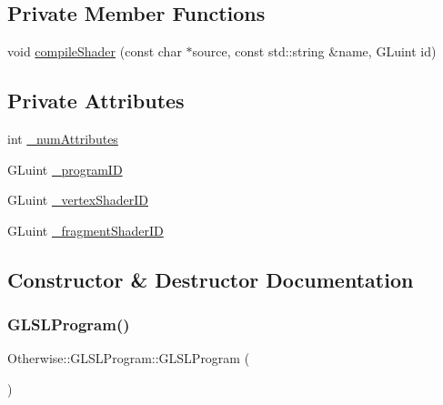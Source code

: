 \subsection*{Private Member Functions}
\begin{DoxyCompactItemize}
\item 
void \hyperlink{class_otherwise_1_1_g_l_s_l_program_aca04ece411763ec9f4ca8844bc6d604e}{compile\+Shader} (const char $\ast$source, const std\+::string \&name, G\+Luint id)
\end{DoxyCompactItemize}
\subsection*{Private Attributes}
\begin{DoxyCompactItemize}
\item 
int \hyperlink{class_otherwise_1_1_g_l_s_l_program_aeafefdfa07adcfdaabced1f366aa3d01}{\+\_\+num\+Attributes}
\item 
G\+Luint \hyperlink{class_otherwise_1_1_g_l_s_l_program_abfd84b5a206e36403770f2a207beb0fa}{\+\_\+program\+ID}
\item 
G\+Luint \hyperlink{class_otherwise_1_1_g_l_s_l_program_a13392933d419cf305911c4a272fa99f0}{\+\_\+vertex\+Shader\+ID}
\item 
G\+Luint \hyperlink{class_otherwise_1_1_g_l_s_l_program_aaa40b8daf7734de8d6a754a37cbf0f2d}{\+\_\+fragment\+Shader\+ID}
\end{DoxyCompactItemize}


\subsection{Constructor \& Destructor Documentation}
\mbox{\label{class_otherwise_1_1_g_l_s_l_program_a2edbc486493a624ff3ff75951c304baa}} 
\subsubsection{\texorpdfstring{G\+L\+S\+L\+Program()}{GLSLProgram()}}
{\footnotesize\ttfamily Otherwise\+::\+G\+L\+S\+L\+Program\+::\+G\+L\+S\+L\+Program (\begin{DoxyParamCaption}{ }\end{DoxyParamCaption})}

